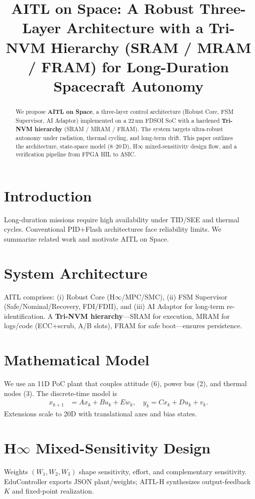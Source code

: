 \documentclass[conference]{IEEEtran}
\title{AITL on Space: A Robust Three-Layer Architecture with a Tri-NVM Hierarchy (SRAM / MRAM / FRAM) for Long-Duration Spacecraft Autonomy}
\author{%
  \IEEEauthorblockN{Shinichi Samizo}
  \IEEEauthorblockA{Independent Semiconductor Researcher\\
  Former Engineer at Seiko Epson Corporation\\
  Email: \href{mailto:shin3t72@gmail.com}{shin3t72@gmail.com}\\
  GitHub: \url{https://github.com/Samizo-AITL}}%
}
\begin{document}
\maketitle

\begin{abstract}
We propose \textbf{AITL on Space}, a three-layer control architecture (Robust Core, FSM Supervisor, AI Adaptor) implemented on a 22\,nm FDSOI SoC with a hardened \textbf{Tri-NVM hierarchy} (SRAM / MRAM / FRAM). The system targets ultra-robust autonomy under radiation, thermal cycling, and long-term drift. This paper outlines the architecture, state-space model (8--20\,D), H$\infty$ mixed-sensitivity design flow, and a verification pipeline from FPGA HIL to ASIC.
\end{abstract}

\section{Introduction}
Long-duration missions require high availability under TID/SEE and thermal cycles. Conventional PID+Flash architectures face reliability limits. We summarize related work and motivate AITL on Space.

\section{System Architecture}
AITL comprises: (i) Robust Core (H$\infty$/MPC/SMC), (ii) FSM Supervisor (Safe/Nominal/Recovery, FDI/FDII), and (iii) AI Adaptor for long-term re-identification. A \textbf{Tri-NVM hierarchy}---SRAM for execution, MRAM for logs/code (ECC+scrub, A/B slots), FRAM for safe boot---ensures persistence.

\section{Mathematical Model}
We use an 11D PoC plant that couples attitude (6), power bus (2), and thermal nodes (3). The discrete-time model is
\begin{align}
x_{k+1} &= A x_k + B u_k + E w_k, \quad
y_k = C x_k + D u_k + v_k.
\end{align}
Extensions scale to 20D with translational axes and bias states.

\section{H$\infty$ Mixed-Sensitivity Design}
Weights $(W_1,W_2,W_3)$ shape sensitivity, effort, and complementary sensitivity. EduController exports JSON plant/weights; AITL-H synthesizes output-feedback $K$ and fixed-point realization.
\end{document}
